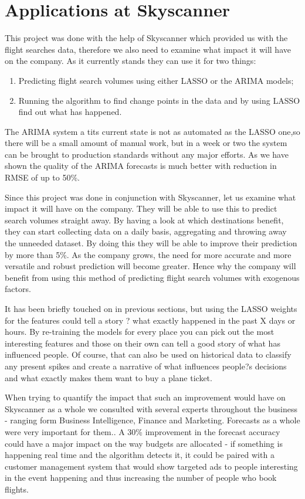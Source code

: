 \documentclass[minf,twoside,singlespacing,parskip,frontabs,notimes,12pt]{infthesis} %
\begin{document}
\section{Applications at Skyscanner}

This project was done with the help of Skyscanner which provided us with the flight searches data, therefore we also need to examine what impact it will have on the company. As it currently stands they can use it for two things:
\begin{enumerate}
\item Predicting flight search volumes using either LASSO or the ARIMA models;
\item Running the algorithm to find change points in the data and by using LASSO find out what has happened.
\end{enumerate}

The ARIMA system a tits current state is not as automated as the LASSO one,so there will be a small amount of manual work, but in a week or two the system can be brought to production standards without any major efforts. As we have shown the quality of the ARIMA forecasts is much better with reduction in RMSE of up to 50\%. 


Since this project was done in conjunction with Skyscanner, let us examine what impact it will have on the company. They will be able to use this to predict search volumes straight away. By having a look at which destinations benefit, they can start collecting data on a daily basis, aggregating and throwing away the unneeded dataset. By doing this they will be able to improve their prediction by more than 5\%. As the company grows, the need for more accurate and more versatile and robust prediction will become greater. Hence why the company will benefit from using this method of predicting flight search volumes with exogenous factors.

It has been briefly touched on in previous sections, but using the LASSO weights for the features could tell a story ? what exactly happened in the past X days or hours. By re-training the models for every place you can pick out the most interesting features and those on their own can tell a good story of what has influenced people. Of course, that can also be used on historical data to classify any present spikes and create a narrative of what influences people?s decisions and what exactly makes them want to buy a plane ticket.

When trying to quantify the impact that such an improvement would have on Skyscanner as a whole we consulted with several experts throughout the business - ranging form Business Intelligence, Finance and Marketing. Forecasts as a whole were very important for them.. A 30\% improvement in the forecast accuracy could have a major impact on the way budgets are allocated - if something is happening real time and the algorithm detects it, it could be paired with a customer management system that would show targeted ads to people interesting in the event happening and thus increasing the number of people who book flights.
\end{document}
